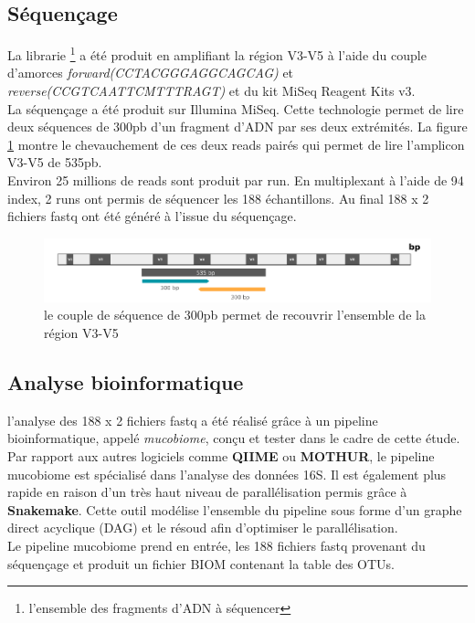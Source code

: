 \documentclass[12pt,a4paper]{article}
\begin{document}
\subsection{Séquençage}
La librarie \footnote{l'ensemble des fragments d'ADN à séquencer} a été produit en amplifiant la région V3-V5 à l’aide du couple d’amorces  \textit{forward(CCTACGGGAGGCAGCAG)} et \textit{reverse(CCGTCAATTCMTTTRAGT)} et du kit MiSeq Reagent Kits v3. \\
La séquençage a été produit sur Illumina MiSeq. Cette technologie permet de lire deux séquences de 300pb d'un fragment d'ADN par ses deux extrémités. La figure \ref{illumina} montre le chevauchement de ces deux reads pairés qui permet de lire l'amplicon V3-V5 de 535pb. \\
Environ 25 millions de reads sont produit par run. En multiplexant à l’aide de 94 index, 2 runs ont permis de séquencer les 188 échantillons.
Au final 188 x 2 fichiers fastq ont été généré à l’issue du séquençage.

\begin{figure}[ht]
\begin{center}
\includegraphics[scale=0.6]{img/illumina.png}\hfill
\end{center}
\caption{le couple de séquence de 300pb permet de recouvrir l'ensemble de la région V3-V5}
\label{illumina}
\end{figure}


\subsection{Analyse bioinformatique}

l’analyse des 188 x 2 fichiers fastq a été réalisé grâce à un pipeline bioinformatique, appelé \textit{mucobiome}, conçu et tester dans le cadre de cette étude. Par rapport aux autres logiciels comme \textbf{QIIME} ou \textbf{MOTHUR}, le pipeline mucobiome est spécialisé dans l’analyse des données 16S. Il est également plus rapide en raison d’un très haut niveau de parallélisation permis grâce à  \textbf{Snakemake}. Cette outil modélise l'ensemble du pipeline sous forme d'un graphe direct acyclique (DAG) et le résoud afin d'optimiser le parallélisation. \\
Le pipeline mucobiome prend en entrée, les 188 fichiers fastq provenant du séquençage et produit un fichier BIOM contenant la table des OTUs.
\end{document}
